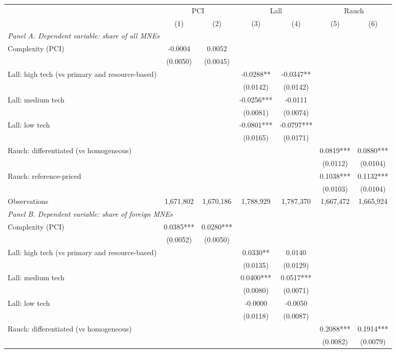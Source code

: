 \begin{tabular}{lcccccc} \hline
 & \multicolumn{2}{c}{PCI} & \multicolumn{2}{c}{Lall} & \multicolumn{2}{c}{Rauch} \\
 & (1) & (2) & (3) & (4) & (5) & (6) \\ \hline
\multicolumn{7}{l}{\textit{Panel A. Dependent variable: share of all MNEs}} \\
Complexity (PCI) & -0.0004 & 0.0052 &  &  &  &  \\
 & (0.0050) & (0.0045) &  &  &  &  \\
Lall: high tech (vs primary and resource-based) &  &  & -0.0288** & -0.0347** &  &  \\
 &  &  & (0.0142) & (0.0142) &  &  \\
Lall: medium tech &  &  & -0.0256*** & -0.0111 &  &  \\
 &  &  & (0.0081) & (0.0074) &  &  \\
Lall: low tech &  &  & -0.0801*** & -0.0797*** &  &  \\
 &  &  & (0.0165) & (0.0171) &  &  \\
Rauch: differentiated (vs homogeneous) &  &  &  &  & 0.0819*** & 0.0880*** \\
 &  &  &  &  & (0.0112) & (0.0104) \\
Rauch: reference-priced &  &  &  &  & 0.1038*** & 0.1132*** \\
 &  &  &  &  & (0.0103) & (0.0104) \\
Observations & 1,671,802 & 1,670,186 & 1,788,929 & 1,787,370 & 1,667,472 & 1,665,924 \\
\midrule
\multicolumn{7}{l}{\textit{Panel B. Dependent variable: share of foreign MNEs}} \\
Complexity (PCI) & 0.0385*** & 0.0280*** &  &  &  &  \\
 & (0.0052) & (0.0050) &  &  &  &  \\
Lall: high tech (vs primary and resource-based) &  &  & 0.0330** & 0.0140 &  &  \\
 &  &  & (0.0135) & (0.0129) &  &  \\
Lall: medium tech &  &  & 0.0400*** & 0.0517*** &  &  \\
 &  &  & (0.0080) & (0.0071) &  &  \\
Lall: low tech &  &  & -0.0000 & -0.0050 &  &  \\
 &  &  & (0.0118) & (0.0087) &  &  \\
Rauch: differentiated (vs homogeneous) &  &  &  &  & 0.2088*** & 0.1914*** \\
 &  &  &  &  & (0.0082) & (0.0079) \\

\end{tabular}
